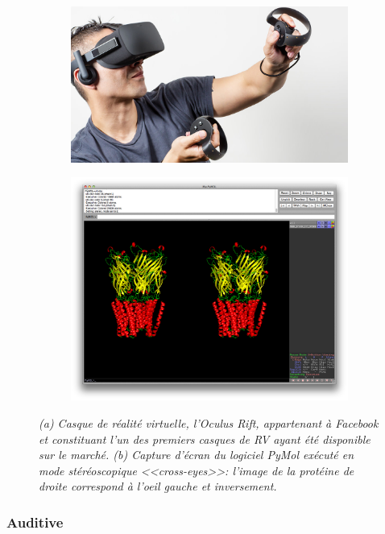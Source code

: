 \begin{figure}
\begin{subfigure}{.5\textwidth}
  \centering
  {\includegraphics[width=.75\linewidth]{./figures/ch2/occulus}}
    \caption{}
  \label{Fig:occulus}
  \hspace{0.3cm}
\end{subfigure}
\begin{subfigure}{.5\textwidth}
  \centering
  {\includegraphics[width=.75\linewidth]{./figures/ch2/pymol_stereo}}
    \caption{}
  \label{Fig:pymol_stereo}
  \hspace{0.3cm}
\end{subfigure}
\caption[(a) Casque de Réalité Virtuelle. (b) Capture d'écran du logiciel PyNol en mode stéréoscopique.]{\it (a) Casque de réalité virtuelle, l'Oculus Rift, appartenant à Facebook et constituant l'un des premiers casques de RV ayant été disponible sur le marché. (b) Capture d'écran du logiciel PyMol exécuté en mode stéréoscopique <<cross-eyes>>: l'image de la protéine de droite correspond à l'oeil gauche et inversement.}
\end{figure}



\subsubsection{Auditive} \label{immersion_audio}

